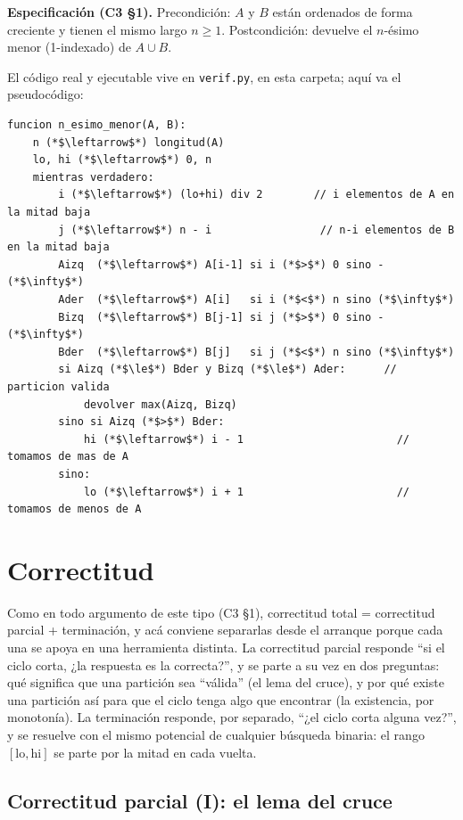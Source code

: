\documentclass[11pt]{article}
\begin{document}
\textbf{Especificación (C3 §1).} Precondición: $A$ y $B$ están ordenados de forma creciente y tienen el
mismo largo $n\ge 1$. Postcondición: devuelve el $n$-ésimo menor (1-indexado) de $A\cup B$.

El código real y ejecutable vive en \texttt{verif.py}, en esta carpeta; aquí va el pseudocódigo:

\begin{lstlisting}[style=pseudo]
funcion n_esimo_menor(A, B):
    n (*$\leftarrow$*) longitud(A)
    lo, hi (*$\leftarrow$*) 0, n
    mientras verdadero:
        i (*$\leftarrow$*) (lo+hi) div 2        // i elementos de A en la mitad baja
        j (*$\leftarrow$*) n - i                 // n-i elementos de B en la mitad baja
        Aizq  (*$\leftarrow$*) A[i-1] si i (*$>$*) 0 sino -(*$\infty$*)
        Ader  (*$\leftarrow$*) A[i]   si i (*$<$*) n sino (*$\infty$*)
        Bizq  (*$\leftarrow$*) B[j-1] si j (*$>$*) 0 sino -(*$\infty$*)
        Bder  (*$\leftarrow$*) B[j]   si j (*$<$*) n sino (*$\infty$*)
        si Aizq (*$\le$*) Bder y Bizq (*$\le$*) Ader:      // particion valida
            devolver max(Aizq, Bizq)
        sino si Aizq (*$>$*) Bder:
            hi (*$\leftarrow$*) i - 1                        // tomamos de mas de A
        sino:
            lo (*$\leftarrow$*) i + 1                        // tomamos de menos de A
\end{lstlisting}

\section{Correctitud}

Como en todo argumento de este tipo (C3 §1), correctitud total = correctitud parcial + terminación, y acá
conviene separarlas desde el arranque porque cada una se apoya en una herramienta distinta. La correctitud
parcial responde ``si el ciclo corta, ¿la respuesta es la correcta?'', y se parte a su vez en dos preguntas:
qué significa que una partición sea ``válida'' (el lema del cruce), y por qué existe una partición así para
que el ciclo tenga algo que encontrar (la existencia, por monotonía). La terminación responde, por separado,
``¿el ciclo corta alguna vez?'', y se resuelve con el mismo potencial de cualquier búsqueda binaria: el
rango $[\mathrm{lo},\mathrm{hi}]$ se parte por la mitad en cada vuelta.

\subsection*{Correctitud parcial (I): el lema del cruce}
\end{document}

